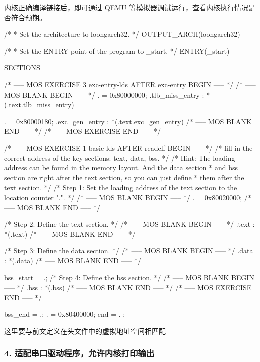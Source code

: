 内核正确编译链接后，即可通过 QEMU 等模拟器调试运行，查看内核执行情况是否符合预期。

\begin{CodeBlock}[language=BookLoongArch]
/*
 * Set the architecture to loongarch32.
 */
OUTPUT_ARCH(loongarch32)

/*
 * Set the ENTRY point of the program to _start.
 */
ENTRY(_start)

SECTIONS {
    /* ----- MOS EXERCISE 3 exc-entry-lds AFTER exc-entry BEGIN ----- */
    /* ----- MOS BLANK BEGIN ----- */
    . = 0x80000000;
    .tlb_miss_entry : {
        *(.text.tlb_miss_entry)
    }

    . = 0x80000180;
    .exc_gen_entry : {
        *(.text.exc_gen_entry)
    }
    /* ----- MOS BLANK END ----- */
    /* ----- MOS EXERCISE END ----- */

    /* ----- MOS EXERCISE 1 basic-lds AFTER readelf BEGIN ----- */
    /* fill in the correct address of the key sections: text, data, bss. */
    /* Hint: The loading address can be found in the memory layout. And the data section
     *       and bss section are right after the text section, so you can just define
     *       them after the text section.
     */
    /* Step 1: Set the loading address of the text section to the location counter ".". */
    /* ----- MOS BLANK BEGIN ----- */
    . = 0x80020000;
    /* ----- MOS BLANK END ----- */

    /* Step 2: Define the text section. */
    /* ----- MOS BLANK BEGIN ----- */
    .text : {
        *(.text)
    }
    /* ----- MOS BLANK END ----- */

    /* Step 3: Define the data section. */
    /* ----- MOS BLANK BEGIN ----- */
    .data : {
        *(.data)
    }
    /* ----- MOS BLANK END ----- */

    bss_start = .;
    /* Step 4: Define the bss section. */
    /* ----- MOS BLANK BEGIN ----- */
    .bss  : {
        *(.bss)
    }
    /* ----- MOS BLANK END ----- */
    /* ----- MOS EXERCISE END ----- */

    bss_end = .;
    . = 0x80400000;
    end = . ;
}

\end{CodeBlock}

这里要与前文定义在头文件中的虚拟地址空间相匹配

\subsubsection{4. 适配串口驱动程序，允许内核打印输出}\label{sec:13-operating-system-006}


